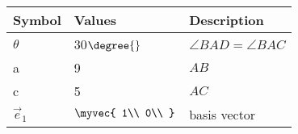 \begin{tabular}{|p{3cm}|p{3cm}|p{3cm}|}
\hline                                        
\textbf{Symbol} & \textbf{Values} & \textbf{Description}\\                                          
\hline                                 
$\theta$ & 30$\degree{}$   & $\angle{BAD} = \angle{BAC}$ \\           
\hline                                    
a &  9 & $AB$ \\     
\hline                      
c & 5 & $AC$ \\
\hline                                     
		$\vec{e}_1$ & $\myvec{
			1\\
			0\\
			}$ & basis vector\\ 
\hline
\end{tabular}

